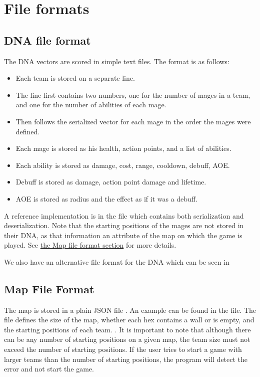 
\chapter{File formats}
\label{file-formats}

\section{DNA file format}
\label{dna-format}

The DNA vectors are scored in simple text files. The format is as follows:

\begin{itemize}
	\item Each team is stored on a separate line.
	\item The line first contains two numbers, one for the number of mages in a team, and one for the number of abilities of each mage.
	\item Then follows the serialized vector for each mage in the order the mages were defined.
	\item Each mage is stored as his health, action points, and a list of abilities.
	\item Each ability is stored as damage, cost, range, cooldown, debuff, AOE.
	\item Debuff is stored as damage, action point damage and lifetime.
	\item AOE is stored as radius and the effect as if it was a debuff.
\end{itemize}

A reference implementation is in the  file which contains both serialization and deserialization. Note that the starting positions of the mages are not stored in their DNA, as that information an attribute of the map on which the game is played. See \hyperref[map-format]{the Map file format section} for more details.

We also have an alternative file format for the DNA which can be seen in

\section{Map File Format}
\label{map-format}

The map is stored in a plain JSON file \citep{json}. An example can be found in the  file. The file defines the size of the map, whether each hex contains a wall or is empty, and the starting positions of each team. . It is important to note that although there can be any number of starting positions on a given map, the team size must not exceed the number of starting positions. If the user tries to start a game with larger teams than the number of starting positions, the program will detect the error and not start the game.

